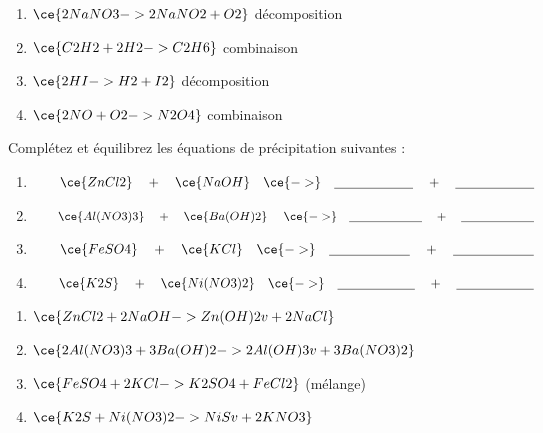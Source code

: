 \documentclass[
  11pt,
  a4paper,
  openany]{book}
\begin{document}
\begin{Answer}

\begin{enumerate}
\def\labelenumi{\arabic{enumi}.}
\item
  \(\ce{2NaNO3 -> 2NaNO2 + O2}\) décomposition
\item
  \(\ce{C2H2 + 2H2 -> C2H6}\) combinaison
\item
  \(\ce{2HI -> H2 + I2}\) décomposition
\item
  \(\ce{2NO + O2 -> N2O4}\) combinaison
\end{enumerate}

\end{Answer}

\begin{Exercise}

Complétez et équilibrez les équations de précipitation suivantes :

\begin{enumerate}
\def\labelenumi{\arabic{enumi}.}
\item
  \(\qquad \ce{ZnCl2} \quad + \quad \ce{NaOH} \quad \ce{->} \quad \underline{\hspace{6em}} \quad + \quad \underline{\hspace{6em}}\)
\item
  \(\qquad \ce{Al(NO3)3} \quad + \quad \ce{Ba(OH)2} \quad \ce{->} \quad \underline{\hspace{6em}} \quad + \quad \underline{\hspace{6em}}\)
\item
  \(\qquad \ce{FeSO4} \quad + \quad \ce{KCl} \quad \ce{->} \quad \underline{\hspace{6em}} \quad + \quad \underline{\hspace{6em}}\)
\item
  \(\qquad \ce{K2S} \quad + \quad \ce{Ni(NO3)2} \quad \ce{->} \quad \underline{\hspace{6em}} \quad + \quad \underline{\hspace{6em}}\)
\end{enumerate}

\end{Exercise}

\begin{Answer}

\begin{enumerate}
\def\labelenumi{\arabic{enumi}.}
\item
  \(\ce{ZnCl2 + 2NaOH -> Zn(OH)2 v + 2NaCl}\)
\item
  \(\ce{ 2Al(NO3)3 + 3Ba(OH)2 -> 2Al(OH)3 v + 3Ba(NO3)2}\)
\item
  \(\ce{FeSO4 + 2KCl -> K2SO4 + FeCl2}\) (mélange)
\item
  \(\ce{K2S + Ni(NO3)2 -> NiS v + 2KNO3}\)
\end{enumerate}

\end{Answer}
\end{document}
